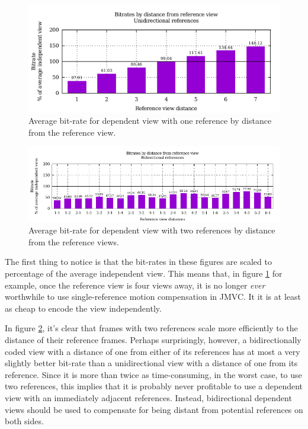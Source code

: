 \documentclass[twoside, 11pt]{article}
\begin{document}
\begin{figure}
\centering
\includegraphics[width=.7\textwidth]{figures/motion_vector_data_unconstrained_unidirectional.pdf}
\caption{Average bit-rate for dependent view with one reference by distance
from the reference view.}
\label{fig:uniframes}
\end{figure}

\begin{figure}
\centering
\includegraphics[width=\textwidth]{figures/motion_vector_data_unconstrained_bidirectional.pdf}
\caption{Average bit-rate for dependent view with two references by distance
from the reference views.}
\label{fig:biframes}
\end{figure}

The first thing to notice is that the bit-rates in these figures are scaled to
percentage of the average independent view. This means that, in figure
\ref{fig:uniframes} for example, once the reference view is four views away,
it is no longer {\it ever} worthwhile to use single-reference motion
compensation in JMVC. It it is at least as cheap to encode the view
independently.

In figure \ref{fig:biframes}, it's clear that frames with two references scale
more efficiently to the distance of their reference frames. Perhaps
surprisingly, however, a bidirectionally coded view with a distance of one from
either of its references has at most a very slightly better bit-rate than a
unidirectional view with a distance of one from its reference. Since it is more
than twice as time-consuming, in the worst case, to use two references, this
implies that it is probably never profitable to use a dependent view with an
immediately adjacent references. Instead, bidirectional dependent views should
be used to compensate for being distant from potential references on both sides.
\end{document}
